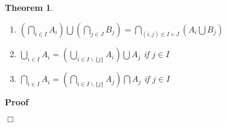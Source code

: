 \documentclass{book}
\newenvironment{proof}{\noindent\textbf{Proof\ }}{\hspace*{\fill}$\Box$\medskip}
\newtheorem{theorem}{Theorem}
\begin{document}
{{\begin{theorem}
\begin{enumerate}
    \item $\left( \bigcap_{i \in I} A_i \right) \bigcup \left( \bigcap_{j \in
    J} B_j \right) = \bigcap_{(i, j) \in I \times J} \left( A_i \bigcup B_j
    \right)$
    
    \item $\bigcup_{i \in I} A_i = \left( \bigcup_{i \in I \backslash \{ j \}}
    A_i \right) \bigcup A_j$ if $j \in I$
    
    \item $\bigcap_{i \in I} A_i = \left( \bigcap_{i \in I \backslash \{ j \}}
    A_j \right) \bigcap A_j$ if $j \in I$
  \end{enumerate}
\end{theorem}

\begin{proof}
  

\end{proof}}}
\end{document}
